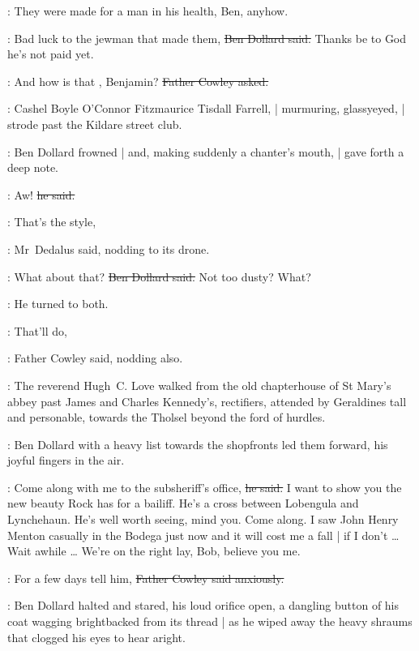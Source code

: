 \simon:
They were made for a man in his health, Ben, anyhow.

\dollard:
Bad luck to the jewman that made them,
\sout{Ben Dollard said.}
Thanks be to God he's not paid yet.

\cowley:
And how is that , Benjamin?
\sout{Father Cowley asked.}

\begin{interject}
    :
    Cashel Boyle O'Connor Fitzmaurice Tisdall Farrell, |
    murmuring, glassy\-eyed, |
    strode past the Kildare street club.
\end{interject}%

:
Ben Dollard frowned |
and, making suddenly a chanter's mouth, |
gave forth a deep note.

\dollard:
Aw!
\sout{he said.}

\simon:
That's the style,

:
Mr~Dedalus said,
nodding to its drone.

\dollard:
What about that?
\sout{Ben Dollard said.}
Not too dusty?
What?

:
He turned to both.

\cowley:
That'll do,

:
Father Cowley said,
nodding also.

\begin{interject}
    :
    The reverend Hugh~C. Love
    walked from the old chapterhouse of St Mary's abbey
    past James and Charles Kennedy's, rectifiers,
    attended by Geraldines tall and personable,
    towards the Tholsel beyond the ford of hurdles.
\end{interject}%

:
Ben Dollard with a heavy list towards the shopfronts
led them forward,
his joyful fingers in the air.

\dollard:
Come along with me to the subsheriff's office,
\sout{he said.}
I want to show you the new beauty Rock has for a bailiff.
He's a cross between Lobengula and Lynchehaun.
He's well worth seeing, mind you.
Come along.
I saw John Henry Menton casually in the Bodega just now
and it will cost me a fall |
if I don't \ldots
Wait awhile \ldots
We're on the right lay, Bob, believe you me.

\cowley:
For a few days tell him,
\sout{Father Cowley said anxiously.}

:
Ben Dollard halted and stared,%
his loud orifice open,
a dangling button of his coat wagging brightbacked from its thread |
as he wiped away the heavy shraums that clogged his eyes
to hear aright.

